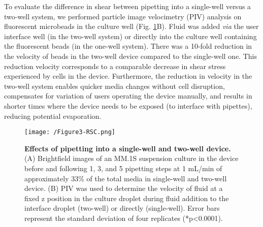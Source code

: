 To evaluate the difference in shear between pipetting into a single-well versus a two-well system, we performed particle image velocimetry (PIV) analysis on fluorescent microbeads in the culture well (Fig. \ref{figure:Fig3}B). Fluid was added \textit{via} the user interface well (in the two-well system) or directly into the culture well containing the fluorescent beads (in the one-well system). There was a 10-fold reduction in the velocity of beads in the two-well device compared to the single-well one. This reduction velocity corresponds to a comparable decrease in shear stress experienced by cells in the device. Furthermore, the reduction in velocity in the two-well system enables quicker media changes without cell disruption, compensates for variation of users operating the device manually, and results in shorter times where the device needs to be exposed (to interface with pipettes), reducing potential evaporation.

\begin{figure}[h!] %
\centering
\texttt{[image: /Figure3-RSC.png]}
\caption[\textbf{Effects of pipetting into a single-well and two-well device.}]{\textbf{Effects of pipetting into a single-well and two-well device.} (A) Brightfield images of an MM.1S suspension culture in the device before and following 1, 3, and 5 pipetting steps at 1 mL/min of approximately 33\% of the total media in single-well and two-well device. (B) PIV was used to determine the velocity of fluid at a fixed z position in the culture droplet during fluid addition to the interface droplet (two-well) or directly (single-well). Error bars represent the standard deviation of four replicates (*p<0.0001).}
\label{figure:Fig3}
\end{figure}

